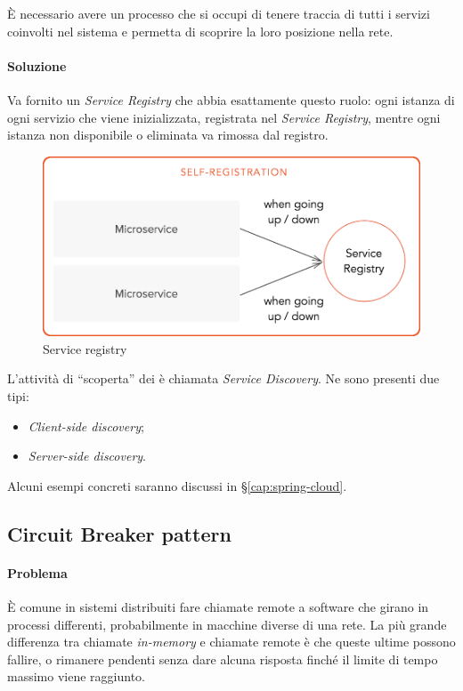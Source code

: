È necessario avere un processo che si occupi di tenere traccia di tutti i servizi coinvolti nel sistema e permetta di scoprire la loro posizione nella rete.

\paragraph*{Soluzione} Va fornito un \textit{Service Registry} che abbia esattamente questo ruolo:
ogni istanza di ogni servizio che viene inizializzata, registrata nel \textit{Service Registry}, mentre ogni istanza non disponibile o eliminata va rimossa dal registro.

\begin{figure}[H]
	\centering
	\includegraphics[width=\textwidth]{immagini/service-registry.png}
	\caption[Service Registry]{Service registry\footnotemark}
\end{figure}

L'attività di ``scoperta'' dei  è chiamata \textit{Service Discovery}. Ne sono presenti due tipi:
\begin{itemize}
	\item \textit{Client-side discovery};
	\item \textit{Server-side discovery}.
\end{itemize}
Alcuni esempi concreti saranno discussi in \S\ref{cap:spring-cloud}.


\subsection{Circuit Breaker pattern}\label{circuit-breaker}

\paragraph*{Problema} È comune in sistemi distribuiti fare chiamate remote a software che girano in processi differenti, probabilmente in macchine diverse di una rete.
La più grande differenza tra chiamate \textit{in-memory} e chiamate remote è che queste ultime possono fallire, o rimanere pendenti senza dare alcuna risposta finché il limite di tempo massimo viene raggiunto.

